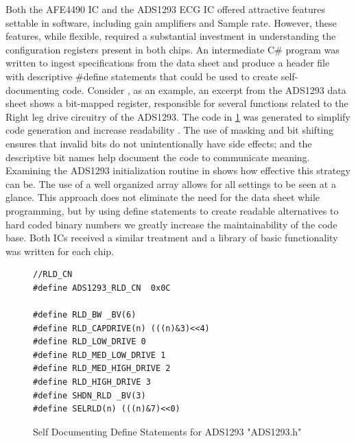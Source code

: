Both the AFE4490  IC and the ADS1293 ECG IC offered attractive features settable in software, including gain amplifiers and Sample rate. However, these features, while flexible, required a substantial investment in understanding the configuration registers present in both chips. An intermediate C\# program was written to ingest specifications from the data sheet and produce a header file with descriptive \#define statements that could be used to create self-documenting code. Consider , as an example, an excerpt from the ADS1293 data sheet shows a  bit-mapped register, responsible for several functions related to the Right leg drive circuitry of the ADS1293. The code in \cref{fig:ADS1293_Defines} was generated to simplify code generation and increase readability . The use of masking and bit shifting ensures that invalid bits do not unintentionally have side effects; and the descriptive bit names help document the code to communicate meaning. Examining the ADS1293 initialization routine in  shows how effective this strategy can be. The use of a well organized array allows for all settings to be seen at a glance. This approach does not eliminate the need for the data sheet while programming, but by using define statements to create readable alternatives to hard coded binary numbers we greatly increase the maintainability of the code base. Both ICs received a similar treatment and a library of basic functionality was written for each chip.

\begin{figure}
	\begin{center}
		\label{fig:ADS1293_Defines}
\begin{lstlisting}[frame=single]
//RLD_CN
#define ADS1293_RLD_CN  0x0C

#define RLD_BW _BV(6)
#define RLD_CAPDRIVE(n) (((n)&3)<<4)
#define RLD_LOW_DRIVE 0
#define RLD_MED_LOW_DRIVE 1
#define RLD_MED_HIGH_DRIVE 2
#define RLD_HIGH_DRIVE 3
#define SHDN_RLD _BV(3)
#define SELRLD(n) (((n)&7)<<0)
\end{lstlisting}
		\caption{Self Documenting Define Statements for ADS1293 "ADS1293.h"}
	\end{center}
\end{figure}



